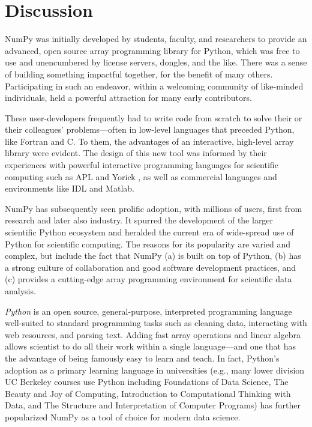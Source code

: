 
\section*{Discussion}

NumPy was initially developed by students, faculty, and researchers to
provide an advanced, open source array programming library for Python,
which was free to use and unencumbered by license servers, dongles, and the like.
There was a sense of building something
impactful together, for the benefit of many others.  Participating in
such an endeavor, within a welcoming community of like-minded
individuals, held a powerful attraction for many early contributors.

These user-developers frequently had to write code from scratch to solve
their or their colleagues' problems---often in low-level languages
that preceded Python, like Fortran \cite{dongarra2008netlib} and C.
To them, the advantages of an interactive, high-level array library
were evident. The design of this new tool was informed by their
experiences with powerful interactive programming languages for
scientific computing such as APL \cite{iverson1962programming} and
Yorick \cite{munro1995using}, as well as commercial languages and
environments like IDL and Matlab.

NumPy has subsequently seen prolific adoption, with millions of users,
first from research and later also industry.
It spurred the development of the larger scientific Python ecosystem and
heralded the current era of wide-spread use of Python for scientific computing.
The reasons for its popularity are varied and complex, but include the fact that
NumPy (a) is built on top of Python,
(b) has a strong culture of collaboration and good software development practices, and
(c) provides a cutting-edge array programming environment for scientific data analysis.

\emph{Python} is an open source, general-purpose, interpreted programming language
well-suited to standard programming tasks such as cleaning data,
interacting with web resources, and parsing text.
Adding fast array operations and linear algebra allows scientist to do all
their work within a single language---and one that has the advantage of
being famously easy to learn and teach.
In fact, Python's adoption as a primary learning language in universities
(e.g., many lower division UC Berkeley courses use Python including
Foundations of Data Science,
The Beauty and Joy of Computing,
Introduction to Computational Thinking with Data,
and The Structure and Interpretation of Computer Programs) has
further popularized NumPy as a tool of choice for modern data science.

